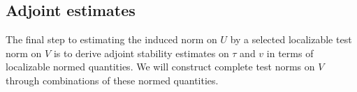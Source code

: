
\subsection{Adjoint estimates}
\label{sec:strategy3}

The final step to estimating the induced norm on $U$ by a selected localizable test norm on $V$ is to derive adjoint stability estimates on $\tau$ and $v$ in terms of localizable normed quantities.  We will construct complete test norms on $V$ through combinations of these normed quantities.%

